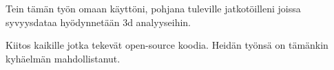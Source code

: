 Tein tämän työn omaan käyttöni, pohjana tuleville jatkotöilleni joissa syvyysdataa hyödynnetään 3d analyyseihin.

Kiitos kaikille jotka tekevät open-source koodia. Heidän työnsä on tämänkin kyhäelmän mahdollistanut.